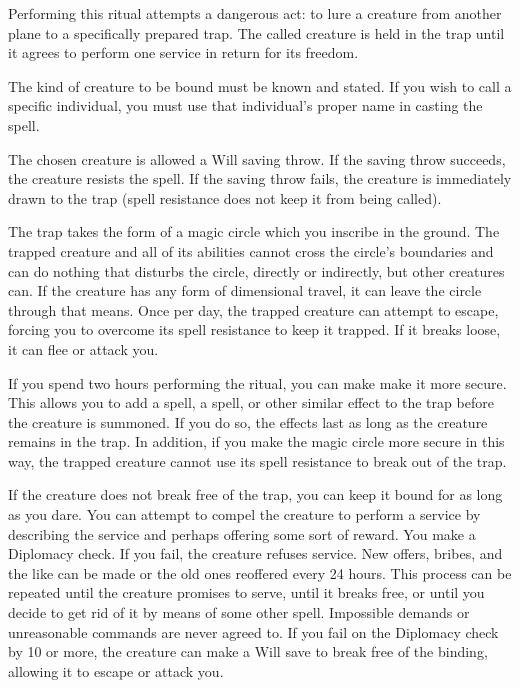 \begin{spelleffect}
Performing this ritual attempts a dangerous act: to lure a creature from another plane to a specifically prepared trap. The called creature is held in the trap until it agrees to perform one service in return for its freedom.
\par The kind of creature to be bound must be known and stated. If you wish to call a specific individual, you must use that individual's proper name in casting the spell.
\par The chosen creature is allowed a Will saving throw. If the saving throw succeeds, the creature resists the spell. If the saving throw fails, the creature is immediately drawn to the trap (spell resistance does not keep it from being called).
\par The trap takes the form of a magic circle which you inscribe in the ground. The trapped creature and all of its abilities cannot cross the circle's boundaries and can do nothing that disturbs the circle, directly or indirectly, but other creatures can. If the creature has any form of dimensional travel, it can leave the circle through that means. Once per day, the trapped creature can attempt to escape, forcing you to overcome its spell resistance to keep it trapped. If it breaks loose, it can flee or attack you.
\par If you spend two hours performing the ritual, you can make make it more secure. This allows you to add a  spell, a  spell, or other similar effect to the trap before the creature is summoned. If you do so, the effects last as long as the creature remains in the trap. In addition, if you make the magic circle more secure in this way, the trapped creature cannot use its spell resistance to break out of the trap.
\par If the creature does not break free of the trap, you can keep it bound for as long as you dare. You can attempt to compel the creature to perform a service by describing the service and perhaps offering some sort of reward. You make a Diplomacy check. If you fail, the creature refuses service. New offers, bribes, and the like can be made or the old ones reoffered every 24 hours. This process can be repeated until the creature promises to serve, until it breaks free, or until you decide to get rid of it by means of some other spell. Impossible demands or unreasonable commands are never agreed to. If you fail on the Diplomacy check by 10 or more, the creature can make a Will save to break free of the binding, allowing it to escape or attack you.

\end{spelleffect}
